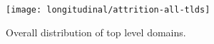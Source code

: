 















\begin{figure}[Ht]
    \centering
    \texttt{[image: longitudinal/attrition-all-tlds]}
    \caption{Overall distribution of top level domains.}
    \label{fig:longitudinal:attrition:attrition-all-tlds}
\end{figure}





